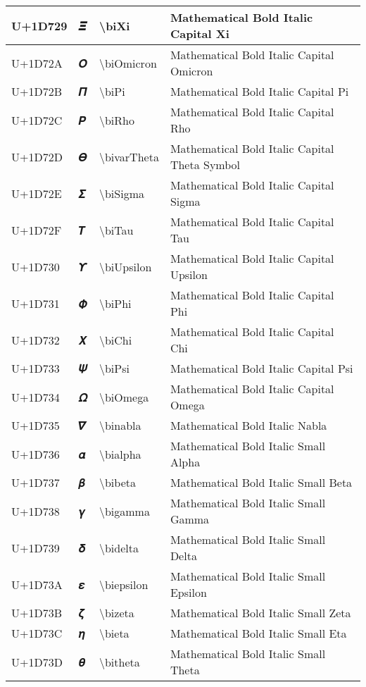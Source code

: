 \begin{table}[h]
\begin{tabulary}{\linewidth}{|L|L|L|L|}
\hline
U+1D729 & 𝜩 & {\textbackslash}biXi & Mathematical Bold Italic Capital Xi \\
\hline
U+1D72A & 𝜪 & {\textbackslash}biOmicron & Mathematical Bold Italic Capital Omicron \\
\hline
U+1D72B & 𝜫 & {\textbackslash}biPi & Mathematical Bold Italic Capital Pi \\
\hline
U+1D72C & 𝜬 & {\textbackslash}biRho & Mathematical Bold Italic Capital Rho \\
\hline
U+1D72D & 𝜭 & {\textbackslash}bivarTheta & Mathematical Bold Italic Capital Theta Symbol \\
\hline
U+1D72E & 𝜮 & {\textbackslash}biSigma & Mathematical Bold Italic Capital Sigma \\
\hline
U+1D72F & 𝜯 & {\textbackslash}biTau & Mathematical Bold Italic Capital Tau \\
\hline
U+1D730 & 𝜰 & {\textbackslash}biUpsilon & Mathematical Bold Italic Capital Upsilon \\
\hline
U+1D731 & 𝜱 & {\textbackslash}biPhi & Mathematical Bold Italic Capital Phi \\
\hline
U+1D732 & 𝜲 & {\textbackslash}biChi & Mathematical Bold Italic Capital Chi \\
\hline
U+1D733 & 𝜳 & {\textbackslash}biPsi & Mathematical Bold Italic Capital Psi \\
\hline
U+1D734 & 𝜴 & {\textbackslash}biOmega & Mathematical Bold Italic Capital Omega \\
\hline
U+1D735 & 𝜵 & {\textbackslash}binabla & Mathematical Bold Italic Nabla \\
\hline
U+1D736 & 𝜶 & {\textbackslash}bialpha & Mathematical Bold Italic Small Alpha \\
\hline
U+1D737 & 𝜷 & {\textbackslash}bibeta & Mathematical Bold Italic Small Beta \\
\hline
U+1D738 & 𝜸 & {\textbackslash}bigamma & Mathematical Bold Italic Small Gamma \\
\hline
U+1D739 & 𝜹 & {\textbackslash}bidelta & Mathematical Bold Italic Small Delta \\
\hline
U+1D73A & 𝜺 & {\textbackslash}biepsilon & Mathematical Bold Italic Small Epsilon \\
\hline
U+1D73B & 𝜻 & {\textbackslash}bizeta & Mathematical Bold Italic Small Zeta \\
\hline
U+1D73C & 𝜼 & {\textbackslash}bieta & Mathematical Bold Italic Small Eta \\
\hline
U+1D73D & 𝜽 & {\textbackslash}bitheta & Mathematical Bold Italic Small Theta \\

\end{tabulary}
\end{table}
